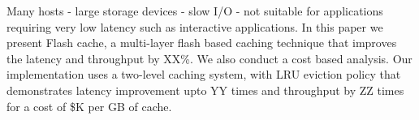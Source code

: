 Many hosts - large storage devices - slow I/O - not suitable for applications requiring very low latency such as interactive applications. In this paper we present Flash cache, a multi-layer flash based caching technique that improves the latency and throughput by XX\%. We also conduct a cost based analysis. Our implementation uses a two-level caching system, with LRU eviction policy that demonstrates latency improvement upto YY times and throughput by ZZ times for a cost of \$K per GB of cache.
